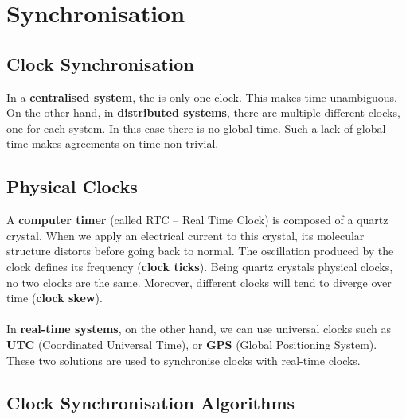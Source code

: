 \documentclass{article}
\begin{document}
\section{Synchronisation}
\subsection{Clock Synchronisation}
In a \textbf{centralised system}, the is only one clock. This makes time unambiguous. On the other hand, in \textbf{distributed systems}, there are multiple different clocks, one for each system. In this case there is no global time. Such a lack of global time makes agreements on time non trivial.

\subsection{Physical Clocks}
A \textbf{computer timer} (called RTC -- Real Time Clock) is composed of a quartz crystal. When we apply an electrical current to this crystal, its molecular structure distorts before going back to normal. The oscillation produced by the clock defines its frequency (\textbf{clock ticks}). Being quartz crystals physical clocks, no two clocks are the same. Moreover, different clocks will tend to diverge over time (\textbf{clock skew}). \\ \\
In \textbf{real-time systems}, on the other hand, we can use universal clocks such as \textbf{UTC} (Coordinated Universal Time), or \textbf{GPS} (Global Positioning System). These two solutions are used to synchronise clocks with real-time clocks.

\subsection{Clock Synchronisation Algorithms}
\end{document}
